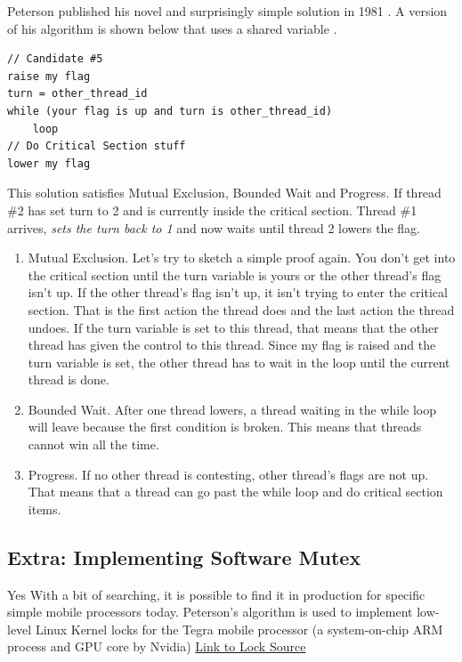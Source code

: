 Peterson published his novel and surprisingly simple solution in 1981 \cite{Peterson1981MythsAT}.
A version of his algorithm is shown below that uses a shared variable .

\begin{lstlisting}
// Candidate #5
raise my flag
turn = other_thread_id
while (your flag is up and turn is other_thread_id)
    loop
// Do Critical Section stuff
lower my flag
\end{lstlisting}

This solution satisfies Mutual Exclusion, Bounded Wait and Progress.
If thread \#2 has set turn to 2 and is currently inside the critical section.
Thread \#1 arrives, \emph{sets the turn back to 1} and now waits until thread 2 lowers the flag.

\begin{enumerate}
\item Mutual Exclusion. Let's try to sketch a simple proof again.
  You don't get into the critical section until the turn variable is yours or the other thread's flag isn't up.
  If the other thread's flag isn't up, it isn't trying to enter the critical section.
  That is the first action the thread does and the last action the thread undoes.
  If the turn variable is set to this thread, that means that the other thread has given the control to this thread.
  Since my flag is raised and the turn variable is set, the other thread has to wait in the loop until the current thread is done.
\item Bounded Wait. After one thread lowers, a thread waiting in the while loop will leave because the first condition is broken. This means that threads cannot win all the time.
\item Progress. If no other thread is contesting, other thread's flags are not up. That means that a thread can go past the while loop and do critical section items.
\end{enumerate}

\subsection{Extra: Implementing Software Mutex}

Yes
With a bit of searching, it is possible to find it in production for specific simple mobile processors today.
Peterson's algorithm is used to implement low-level Linux Kernel locks for the Tegra mobile processor (a system-on-chip ARM process and GPU core by Nvidia) \href{https://android.googlesource.com/kernel/tegra.git/+/android-tegra-3.10/arch/arm/mach-tegra/sleep.S\#58}{Link to Lock Source}

